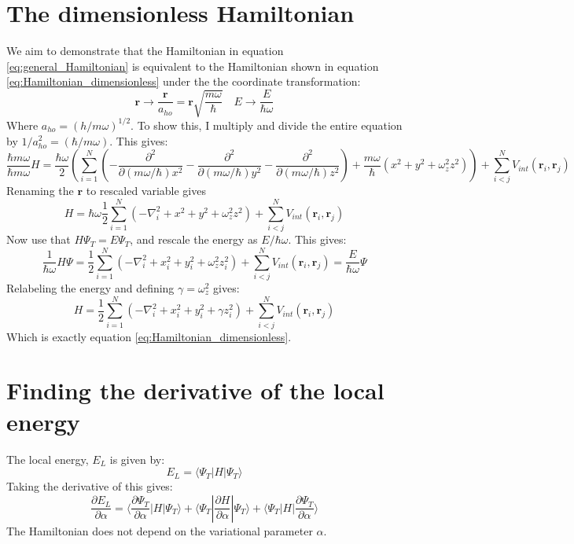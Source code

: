 \documentclass[a4paper, 10pt]{article}
\begin{document}
\begin{appendices}
		\section{The dimensionless Hamiltonian}
		We aim to demonstrate that the Hamiltonian in equation \ref{eq:general_Hamiltonian} is equivalent to the Hamiltonian shown in equation \ref{eq:Hamiltonian_dimensionless} under the the coordinate transformation:
		\begin{equation}
		\boldsymbol{r}\rightarrow \frac{\boldsymbol{r}}{a_{ho}}=\boldsymbol{r} \sqrt{\frac{m\omega}{\hbar}} \quad E\rightarrow \frac{E}{\hbar \omega}
		\end{equation}
		Where $a_{ho}=(h/m\omega)^{1/2}$. To show this, I multiply and divide the entire equation by $1/a_{ho}^2=(\hbar/m\omega)$. This gives:
		\begin{equation}
		\frac{\hbar m\omega }{\hbar m \omega}H =\frac{\hbar \omega}{2} \left(\sum_{i=1}^N \left(-\frac{\partial^2}{\partial (m\omega/\hbar) x^2}-\frac{\partial^2}{\partial (m\omega/\hbar) y^2}-\frac{\partial^2}{\partial (m\omega/\hbar) z^2}      \right)+ \frac{m\omega}{\hbar}\left(x^2+y^2+\omega_z^2 z^2\right)\right)+\sum_{i<j}^N V_{int}(\boldsymbol{r}_i, \boldsymbol{r}_j)
		\end{equation}
		Renaming the $\boldsymbol{r}$ to rescaled variable gives 
		\begin{equation}
		H=\hbar \omega \frac{1}{2}\sum_{i=1}^N \left(-\nabla^2_i+x^2+y^2+ \omega_z^2 z^2\right)+\sum_{i<j}^N V_{int}(\boldsymbol{r}_i, \boldsymbol{r}_j)
		\end{equation}
		Now use that $H\Psi_T=E\Psi_T$, and rescale the energy as $E/\hbar \omega$. This gives:
		\begin{equation}
		\frac{1}{\hbar \omega}H\Psi = \frac{1}{2}\sum_{i=1}^N\left(-\nabla^2_i +x_i^2+y_i^2+  \omega_z^2 z_i^2\right)+\sum_{i<j}^N V_{int}(\boldsymbol{r}_i, \boldsymbol{r}_j) = \frac{E}{\hbar \omega}\Psi
		\end{equation}
		Relabeling the energy and defining $\gamma=\omega_z^2$ gives:
		\begin{equation}
		H=\frac{1}{2}\sum_{i=1}^N \left(-\nabla_i^2 +x_i^2+y_i^2+\gamma z_i^2\right)+\sum_{i<j}^N V_{int}(\boldsymbol{r}_i, \boldsymbol{r}_j)
		\end{equation}
		Which is exactly equation \ref{eq:Hamiltonian_dimensionless}.
		\section{Finding the derivative of the local energy}
		The local energy, $E_L$ is given by:
		\begin{equation}
		E_L=\langle \Psi_T | H| \Psi_T \rangle
		\end{equation}
		Taking the derivative of this gives:
		\begin{equation}
		\frac{\partial E_L}{\partial \alpha}=\langle \frac{\partial \Psi_T}{\partial \alpha}|H|\Psi_T\rangle + \langle \Psi_T |\frac{\partial H}{\partial \alpha}	|\Psi_T\rangle + \langle \Psi_T |H|\frac{\partial \Psi_T}{\partial \alpha}\rangle
		\end{equation}
		The Hamiltonian does not depend on the variational parameter $\alpha$. 
	\end{appendices}
\end{document}
